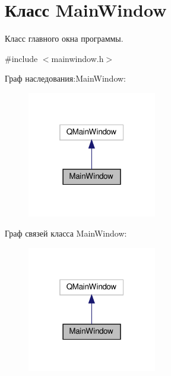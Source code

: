 \hypertarget{classMainWindow}{}\section{Класс Main\+Window}
\label{classMainWindow}


Класс главного окна программы.  




{\ttfamily \#include $<$mainwindow.\+h$>$}



Граф наследования\+:Main\+Window\+:\nopagebreak
\begin{figure}[H]
\begin{center}
\leavevmode
\includegraphics[width=160pt]{classMainWindow__inherit__graph}
\end{center}
\end{figure}


Граф связей класса Main\+Window\+:\nopagebreak
\begin{figure}[H]
\begin{center}
\leavevmode
\includegraphics[width=160pt]{classMainWindow__coll__graph}
\end{center}
\end{figure}
